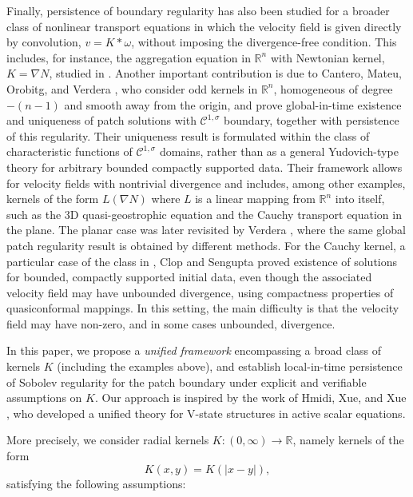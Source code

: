 \documentclass[a4paper]{amsart}
\theoremstyle{definition}
\newcommand{\R}{\ensuremath{\mathbb{R}}}
\newcommand{\Lipa}[1][\gamma]{\ensuremath{\mathcal{C}^#1}}
\newcommand{\LipUa}[1][\gamma]{\ensuremath{\Lipa[{{1,#1}}]}}
\begin{document}
Finally, persistence of boundary regularity has also been studied for a broader class of nonlinear transport equations in which the velocity field is given directly by convolution, \(v=K*\omega\), without imposing the divergence-free condition. This includes, for instance, the aggregation equation in \(\mathbb{R}^n\) with Newtonian kernel, \(K=\nabla N\), studied in \cite{bertozzi2012aggregation, bertozzi2016regularity}. Another important contribution is due to Cantero, Mateu, Orobitg, and Verdera \cite{cantero2021regularity}, who consider odd kernels in \(\mathbb{R}^n\), homogeneous of degree \(-(n-1)\) and smooth away from the origin, and prove global-in-time existence and uniqueness of patch solutions with \(\LipUa[\sigma]\) boundary, together with persistence of this regularity. Their uniqueness result is formulated within the class of characteristic functions of \(\LipUa[\sigma]\) domains, rather than as a general Yudovich-type theory for arbitrary bounded compactly supported data. Their framework allows for velocity fields with nontrivial divergence and includes, among other examples, kernels of the form \(L(\nabla N)\) where $L$ is a linear mapping from $\R^n$ into itself, such as the 3D quasi-geostrophic equation and the Cauchy transport equation in the plane. The planar case was later revisited by Verdera \cite{VerderaRevisited}, where the same global patch regularity result is obtained by different methods. For the Cauchy kernel, a particular case of the class in \cite{cantero2021regularity}, Clop and Sengupta \cite{clop2022nonlinear} proved existence of solutions for bounded, compactly supported initial data, even though the associated velocity field may have unbounded divergence, using compactness properties of quasiconformal mappings. In this setting, the main difficulty is that the velocity field may have non-zero, and in some cases unbounded, divergence.

In this paper, we propose a \textit{unified framework} encompassing a broad class of kernels \(K\) (including the examples above), and establish local-in-time persistence of Sobolev regularity for the patch boundary under explicit and verifiable assumptions on \(K\). Our approach is inspired by the work of Hmidi, Xue, and Xue \cite{hmidi2023unifiedtheoryvstatesstructures}, who developed a unified theory for V-state structures in active scalar equations.

More precisely, we consider radial kernels \(K:(0,\infty)\to\mathbb{R}\), namely kernels of the form
\[
K(x,y)=K(|x-y|),
\]
satisfying the following assumptions:
\end{document}
